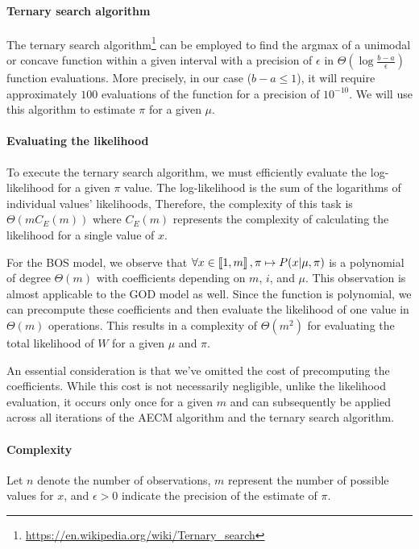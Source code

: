 \paragraph{Ternary search algorithm}


The ternary search algorithm\footnote{\url{https://en.wikipedia.org/wiki/Ternary_search}} can be employed to find the argmax of a unimodal or concave function within a given interval with a precision of $\epsilon$ in $\Theta(\log \frac{b - a}{\epsilon})$ function evaluations. More precisely, in our case ($b - a \leq 1$), it will require approximately $100$ evaluations of the function for a precision of $10^{-10}$. We will use this algorithm to estimate $\pi$ for a given $\mu$.



\paragraph{Evaluating the likelihood}

To execute the ternary search algorithm, we must efficiently evaluate the log-likelihood for a given $\pi$ value. The log-likelihood is the sum of the logarithms of individual values' likelihoods, Therefore, the complexity of this task is $\Theta(m C_E(m))$ where $C_E(m)$ represents the complexity of calculating the likelihood for a single value of $x$.

For the BOS model, we observe that $\forall x \in \left\llbracket1, m\right\rrbracket, \pi \mapsto P(x | \mu, \pi)$ is a polynomial of degree $\Theta(m)$ with coefficients depending on $m$, $i$, and $\mu$. This observation is almost applicable to the GOD model as well. Since the function is polynomial, we can precompute these coefficients and then evaluate the likelihood of one value in $\Theta(m)$ operations. This results in a complexity of $\Theta(m^2)$ for evaluating the total likelihood of $W$ for a given $\mu$ and $\pi$.

An essential consideration is that we've omitted the cost of precomputing the coefficients. While this cost is not necessarily negligible, unlike the likelihood evaluation, it occurs only once for a given $m$ and can subsequently be applied across all iterations of the AECM algorithm and the ternary search algorithm.


\paragraph{Complexity}

Let $n$ denote the number of observations, $m$ represent the number of possible values for $x$, and $\epsilon > 0$ indicate the precision of the estimate of $\pi$.

